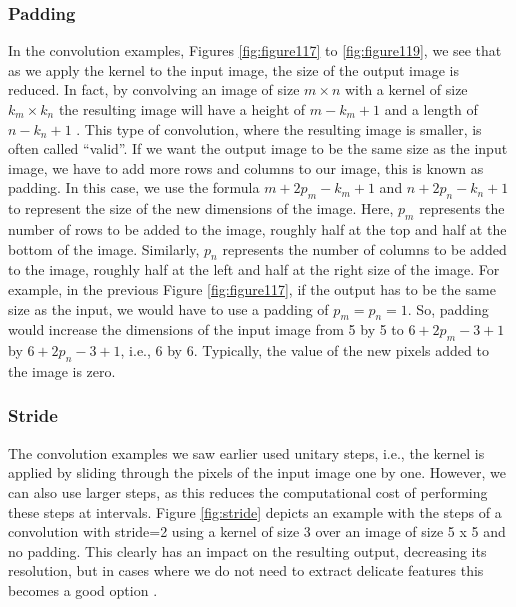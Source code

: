 \subsubsection{Padding}

In the convolution examples, Figures \ref{fig:figure117} to \ref{fig:figure119}, we see that as we apply the kernel to the input image, the size of the output image is reduced. In fact, by convolving an image of size $m \times n$ with a kernel of size $k_m \times k_n$ the resulting image will have a height of $m-k_m+1$ and a length of $n-k_n+1$ . This type of convolution, where the resulting image is smaller, is often called ``valid''.
If we want the output image to be the same size as the input image, we have to add more rows and columns to our image, this is known as padding. In this case, we use the formula  $m+2p_m-k_m+1$ and $n+2p_n-k_n+1$ to represent the size of the new dimensions of the image. Here, $p_m$ represents the number of rows to be added to the image, roughly half at the top and half at the bottom of the image. Similarly, $p_n$ represents the number of columns to be added to the image, roughly half at the left and half at the right size of the image. For example, in the previous Figure \ref{fig:figure117}, if the output has to be the same size as the input, we would have to use a padding of $p_m=p_n=1$. So, padding would increase the dimensions of the input image from 5 by 5 to $6+2p_m-3+1$ by $6+2p_n-3+1$, i.e., 6 by 6. Typically, the value of the new pixels added to the image is zero.

\subsubsection{Stride}

The convolution examples we saw earlier used unitary steps, i.e., the kernel is applied by sliding through the pixels of the input image one by one. However, we can also use larger steps, as this reduces the computational cost of performing these steps at intervals. %
%
%
Figure \ref{fig:stride} depicts an example with the steps of a convolution with stride=2 using a kernel of size 3 over an image of size 5 x 5 and no padding.
This clearly has an impact on the resulting output, decreasing its resolution, but in cases where we do not need to extract delicate features this becomes a good option \cite{goodfellow2016}.

